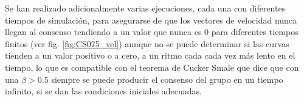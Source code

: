 Se han realizado adicionalmente varias ejecuciones, cada una con diferentes tiempos de simulación, para asegurarse de que los vectores de velocidad nunca llegan al consenso tendiendo a un valor que nunca es 0 para diferentes tiempos finitos (ver fig. \ref{fig:CS075_vel}) aunque no se puede determinar si las curvas tienden a un valor positivo o a cero, a un ritmo cada cada vez más lento en el tiempo, lo que es compatible con el teorema de Cucker Smale que dice que con una $\beta>0.5$ siempre se puede producir el consenso del grupo en un tiempo infinito, si se dan las condiciones iniciales adecuadas.

\begin{figure}[htbp]
\centering

\end{figure}
